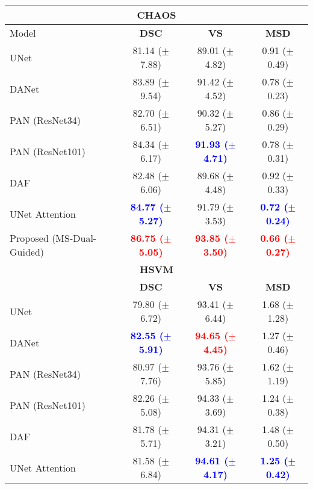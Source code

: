 \documentclass[journal]{IEEEtran}
\begin{document}
\begin{table}[t!]
\centering
\scriptsize
\begin{tabular}{lccc}\\
\toprule
\multicolumn{4}{c}{\textbf{CHAOS}}\\
\midrule
Model & \textbf{DSC} & \textbf{VS} & \textbf{MSD} \\
 \midrule
UNet \cite{ronneberger2015u}  &  81.14 ($\pm$7.88) & 89.01 ($\pm$4.82) & 0.91 ($\pm$0.49)  \\
DANet \cite{fu2018dual}  &   83.89 ($\pm$9.54) & 91.42  ($\pm$4.52) &  0.78  ($\pm$0.23) \\
PAN (ResNet34) \cite{li2018pyramid}    & 82.70 ($\pm$6.51) & 90.32 ($\pm$5.27) & 0.86 ($\pm$0.29) \\
PAN (ResNet101)\cite{li2018pyramid}   & 84.34 ($\pm$6.17) & \textcolor{blue}{\textbf{91.93 ($\pm$4.71)}} & 0.78 ($\pm$0.31)  \\
DAF \cite{wang18d}  &   82.48 ($\pm$6.06)  & 89.68 ($\pm$4.48) &  0.92 ($\pm$0.33) \\
UNet Attention \cite{schlemper2019attention}  &  \textcolor{blue}{\textbf{84.77 ($\pm$5.27)}} & 91.79 ($\pm$3.53) & \textcolor{blue}{\textbf{0.72 ($\pm$0.24)}} \\
Proposed (MS-Dual-Guided)  &  \textcolor{red}{\textbf{86.75 ($\pm$5.05)}} & \textcolor{red}{\textbf{93.85 ($\pm$3.50)}} & \textcolor{red}{\textbf{0.66 ($\pm$0.27)}}  \\
\midrule
\multicolumn{4}{c}{\textbf{HSVM}}\\
\midrule
& \textbf{DSC} & \textbf{VS} & \textbf{MSD}\\
 \midrule
UNet \cite{ronneberger2015u}  &  79.80 ($\pm$6.72) & 93.41 ($\pm$6.44) & 1.68 ($\pm$1.28)\\
DANet \cite{fu2018dual}  &   \textcolor{blue}{\textbf{82.55 ($\pm$5.91)}} & \textcolor{red}{\textbf{94.65 ($\pm$4.45)}} & 1.27 ($\pm$0.46) \\
PAN (ResNet34) \cite{li2018pyramid}    &  80.97 ($\pm$7.76) & 93.76 ($\pm$5.85) & 1.62 ($\pm$1.19) \\
PAN (ResNet101)\cite{li2018pyramid}   &  82.26 ($\pm$5.08) & 94.33 ($\pm$3.69) & 1.24 ($\pm$0.38) \\
DAF \cite{wang18d}  &    81.78 ($\pm$5.71)& 94.31 ($\pm$3.21) & 1.48 ($\pm$0.50) \\
UNet Attention \cite{schlemper2019attention}  & 81.58 ($\pm$6.84) & \textcolor{blue}{\textbf{94.61 ($\pm$4.17)}} & \textcolor{blue}{\textbf{1.25 ($\pm$0.42)}} \\

\end{tabular}
\end{table}
\end{document}
